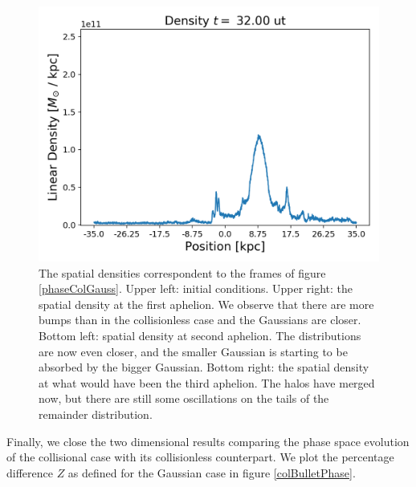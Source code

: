 \begin{figure}[h!]
    \includegraphics[scale=0.45]{imag/cBulletD80.png}
    \caption{The spatial densities correspondent to the frames of figure \ref{phaseColGauss}. Upper left: initial conditions. Upper right: the spatial density at the first aphelion. We observe that there are more bumps than in the collisionless case and the Gaussians are closer. Bottom left: spatial density at second aphelion. The distributions are now even closer, and the smaller Gaussian is starting to be absorbed by the bigger Gaussian. Bottom right: the spatial density at what would have been the third aphelion. The halos have merged now, but there are still some oscillations on the tails of the remainder distribution.}
    \label{densColGauss}
\end{figure}



Finally, we close the two dimensional results comparing the phase space evolution of the collisional case with its collisionless counterpart. We plot the percentage difference $Z$ as defined for the Gaussian case in figure \ref{colBulletPhase}.

